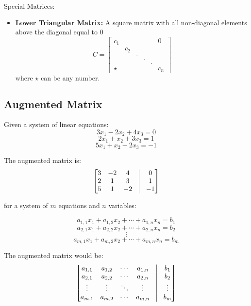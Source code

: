 \documentclass{article}
\begin{document}
\begin{paragraph}{Special Matrices:}
\begin{itemize}
    \item \textbf{Lower Triangular Matrix:} A square matrix with all non-diagonal elements above the diagonal equal to 0
        $$ C = \begin{bmatrix}
            c_1 &&&&& 0 \\
            &c_2&&&&\\
            &&.&&&\\
            &&&.&&\\
            &&&&.&\\
            \star&&&&&c_n
        \end{bmatrix}$$
        where $\star$ can be any number.
\end{itemize}
\end{paragraph}


\subsection*{Augmented Matrix}
Given a system of linear equations:
    $$
    3x_1 - 2x_2 + 4x_3 = 0
    $$
    $$
    2x_1 + x_2 + 3x_3 = 1
    $$
    $$
    5x_1 + x_2 - 2x_3 = -1
    $$
    
The augmented matrix is:
$$
\begin{bmatrix}
    3 & -2 & 4 & \vline & 0 \\
    2 & 1 & 3 & \vline & 1 \\
    5 & 1 & -2 & \vline & -1 
\end{bmatrix}
$$    

for a system of $m$ equations and $n$ variables:

    $$
    a_{1,1} x_1 + a_{1,2} x_2 + \cdots + a_{1,n} x_n = b_1
    $$
    $$
    a_{2,1} x_1 + a_{2,2} x_2 + \cdots + a_{2,n} x_n = b_2
    $$
    $$
    \vdots
    $$
    $$
    a_{m,1} x_1 + a_{m,2} x_2 + \cdots + a_{m,n} x_n = b_m
    $$

The augmented matrix would be:
$$
\begin{bmatrix}
    a_{1,1} & a_{1,2} & \cdots & a_{1,n} & \vline & b_1 \\
    a_{2,1} & a_{2,2} & \cdots & a_{2,n} & \vline & b_2 \\
    \vdots & \vdots & \ddots & \vdots & \vline & \vdots \\
    a_{m,1} & a_{m,2} & \cdots & a_{m,n} & \vline & b_m
\end{bmatrix}
$$
\end{document}
